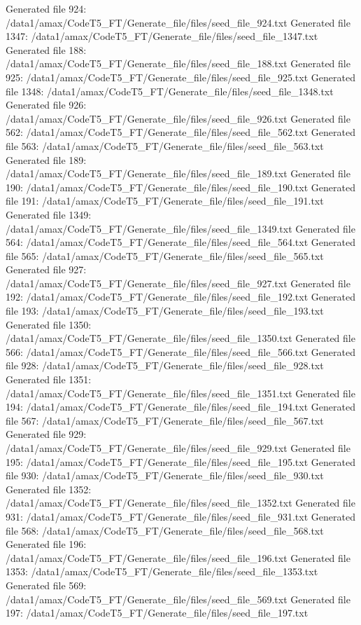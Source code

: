 Generated file 924: /data1/amax/CodeT5_FT/Generate_file/files/seed_file_924.txt
Generated file 1347: /data1/amax/CodeT5_FT/Generate_file/files/seed_file_1347.txt
Generated file 188: /data1/amax/CodeT5_FT/Generate_file/files/seed_file_188.txt
Generated file 925: /data1/amax/CodeT5_FT/Generate_file/files/seed_file_925.txt
Generated file 1348: /data1/amax/CodeT5_FT/Generate_file/files/seed_file_1348.txt
Generated file 926: /data1/amax/CodeT5_FT/Generate_file/files/seed_file_926.txt
Generated file 562: /data1/amax/CodeT5_FT/Generate_file/files/seed_file_562.txt
Generated file 563: /data1/amax/CodeT5_FT/Generate_file/files/seed_file_563.txt
Generated file 189: /data1/amax/CodeT5_FT/Generate_file/files/seed_file_189.txt
Generated file 190: /data1/amax/CodeT5_FT/Generate_file/files/seed_file_190.txt
Generated file 191: /data1/amax/CodeT5_FT/Generate_file/files/seed_file_191.txt
Generated file 1349: /data1/amax/CodeT5_FT/Generate_file/files/seed_file_1349.txt
Generated file 564: /data1/amax/CodeT5_FT/Generate_file/files/seed_file_564.txt
Generated file 565: /data1/amax/CodeT5_FT/Generate_file/files/seed_file_565.txt
Generated file 927: /data1/amax/CodeT5_FT/Generate_file/files/seed_file_927.txt
Generated file 192: /data1/amax/CodeT5_FT/Generate_file/files/seed_file_192.txt
Generated file 193: /data1/amax/CodeT5_FT/Generate_file/files/seed_file_193.txt
Generated file 1350: /data1/amax/CodeT5_FT/Generate_file/files/seed_file_1350.txt
Generated file 566: /data1/amax/CodeT5_FT/Generate_file/files/seed_file_566.txt
Generated file 928: /data1/amax/CodeT5_FT/Generate_file/files/seed_file_928.txt
Generated file 1351: /data1/amax/CodeT5_FT/Generate_file/files/seed_file_1351.txt
Generated file 194: /data1/amax/CodeT5_FT/Generate_file/files/seed_file_194.txt
Generated file 567: /data1/amax/CodeT5_FT/Generate_file/files/seed_file_567.txt
Generated file 929: /data1/amax/CodeT5_FT/Generate_file/files/seed_file_929.txt
Generated file 195: /data1/amax/CodeT5_FT/Generate_file/files/seed_file_195.txt
Generated file 930: /data1/amax/CodeT5_FT/Generate_file/files/seed_file_930.txt
Generated file 1352: /data1/amax/CodeT5_FT/Generate_file/files/seed_file_1352.txt
Generated file 931: /data1/amax/CodeT5_FT/Generate_file/files/seed_file_931.txt
Generated file 568: /data1/amax/CodeT5_FT/Generate_file/files/seed_file_568.txt
Generated file 196: /data1/amax/CodeT5_FT/Generate_file/files/seed_file_196.txt
Generated file 1353: /data1/amax/CodeT5_FT/Generate_file/files/seed_file_1353.txt
Generated file 569: /data1/amax/CodeT5_FT/Generate_file/files/seed_file_569.txt
Generated file 197: /data1/amax/CodeT5_FT/Generate_file/files/seed_file_197.txt
